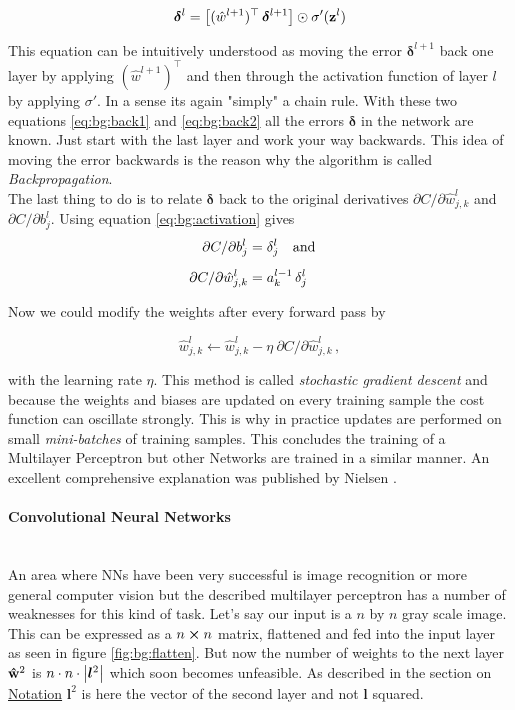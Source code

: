 \begin{equation} \label{eq:bg:back2}
    \boldsymbol \delta^l =
    \qty[(\hat w^{l+1})^\top \, \boldsymbol \delta^{l+1}]
    \odot \sigma'(\vb z^l)
\end{equation}

This equation can be intuitively understood as moving the error
$\boldsymbol \delta^{l+1}$ back one layer by applying $(\hat w^{l+1})^\top$ and then through the activation function of layer $l$ by applying $\sigma'$. In a sense its again "simply" a chain rule. With these two equations \eqref{eq:bg:back1} and \eqref{eq:bg:back2} all the errors $\boldsymbol \delta$ in the network are known. Just start with the last layer and work your way backwards. This idea of moving the error backwards is the reason why the algorithm is called \textit{Backpropagation}. \\

\indent
The last thing to do is to relate $\boldsymbol \delta$ back to the original derivatives $\partial C / \partial \hat w^l_{j,k}$ and $\partial C / \partial b^l_j$. Using equation \eqref{eq:bg:activation} gives
\begin{align}
    \partial C / \partial b^l_j &= \delta^l_j \qq{and} \\[5pt]
    \partial C / \partial \hat w^l_{j,k} &= a^{l-1}_k \, \delta^l_j
\end{align}

Now we could modify the weights after every forward pass by

\begin{equation}
    \hat w^l_{j,k} \leftarrow 
    \hat w^l_{j,k} - \eta \  \partial C / \partial \hat w^l_{j,k} \,,
\end{equation}

with the learning rate $\eta$.
This method is called \textit{stochastic gradient descent} and because the weights and biases are updated on every training sample the cost function can oscillate strongly. 
This is why in practice updates are performed on small \textit{mini-batches}\label{hyp:minibatch} of training samples. This concludes the training of a Multilayer Perceptron but other Networks are trained in a similar manner. An excellent comprehensive explanation was published by Nielsen \cite{backprop}.

\paragraph{Convolutional Neural Networks}~\\
An area where NNs have been very successful is image recognition or more general computer vision but the described multilayer perceptron has a number of weaknesses for this kind of task. Let's say our input is a $n$ by $n$ gray scale image. This can be expressed as a $n \cp n$ matrix, flattened and fed into the input layer as seen in figure \ref{fig:bg:flatten}. But now the number of weights to the next layer $\vu{w}^2$ is $n \cdot n \cdot \qty| \boldsymbol l^2|$
which soon becomes unfeasible. As described in the section on \hyperref[sec:notation]{Notation} $\boldsymbol l^2$ is here the vector of the second layer and not $\boldsymbol l$ squared.

